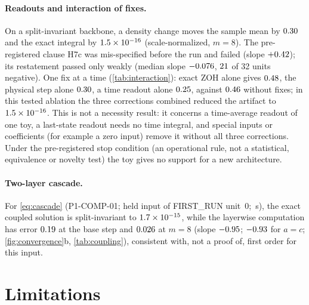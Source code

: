 \documentclass{article}
\theoremstyle{plain}
\theoremstyle{definition}
\theoremstyle{remark}
\begin{document}
\paragraph{Readouts and interaction of fixes.}
On a split-invariant backbone, a density change moves the sample mean by $0.30$ and the exact integral by $1.5\times10^{-16}$ (scale-normalized, $m{=}8$).
The pre-registered clause H7c was mis-specified before the run and failed (slope $+0.42$); its restatement passed only weakly (median slope $-0.076$, $21$ of 32 units negative).
One fix at a time (\cref{tab:interaction}): exact ZOH alone gives $0.48$, the physical step alone $0.30$, a time readout alone $0.25$, against $0.46$ without fixes; in this tested ablation the three corrections combined reduced the artifact to $1.5\times10^{-16}$.
This is not a necessity result: it concerns a time-average readout of one toy, a last-state readout needs no time integral, and special inputs or coefficients (for example a zero input) remove it without all three corrections.
Under the pre-registered stop condition (an operational rule, not a statistical, equivalence or novelty test) the toy gives no support for a new architecture.

\paragraph{Two-layer cascade.}
For \eqref{eq:cascade} (P1-COMP-01; held input of FIRST\_RUN unit~0; \CompSeconds\,s), the exact coupled solution is split-invariant to $1.7\times10^{-15}$, while the layerwise computation has error $0.19$ at the base step and $0.026$ at $m{=}8$ (slope $-0.95$; $-0.93$ for $a=c$; \cref{fig:convergence}b, \cref{tab:coupling}), consistent with, not a proof of, first order for this input.


\section{Limitations}
\label{sec:limits}
\end{document}
